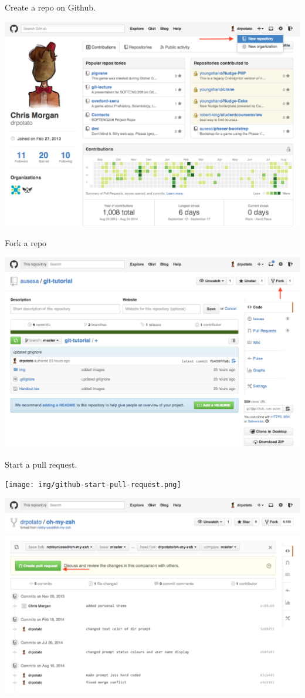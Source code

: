 \documentclass{tufte-handout}
\begin{document}
Create a repo on Github.

\includegraphics[scale=0.4]{img/github-create-repo.png}

Fork a repo

\includegraphics[scale=0.4]{img/github-fork.png}

\pagebreak
Start a pull request.

\texttt{[image: img/github-start-pull-request.png]}

\includegraphics[scale=0.4]{img/github-finish-pull-request.png}
\end{document}

